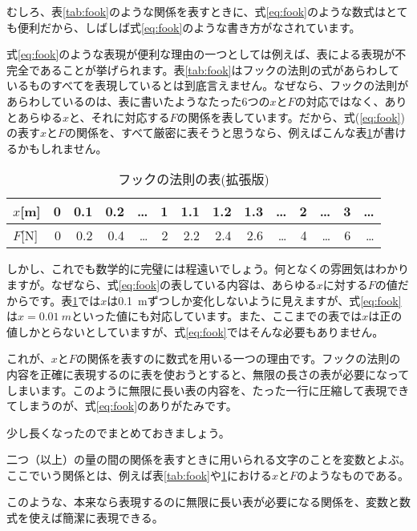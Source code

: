 \documentclass[uplatex,dvipdfmx]{jsarticle}
\begin{document}
	むしろ、表\ref{tab:fook}のような関係を表すときに、式\ref{eq:fook}のような数式はとても便利だから、しばしば式\ref{eq:fook}のような書き方がなされています。

	式\ref{eq:fook}のような表現が便利な理由の一つとしては例えば、表による表現が不完全であることが挙げられます。表\ref{tab:fook}はフックの法則の式があらわしているものすべてを表現しているとは到底言えません。なぜなら、フックの法則があらわしているのは、表に書いたようなたった6つの$x$と$F$の対応ではなく、ありとあらゆる$x$と、それに対応する$F$の関係を表しています。だから、式(\ref{eq:fook})の表す$x$と$F$の関係を、すべて厳密に表そうと思うなら、例えばこんな表\ref{tab:fook_ex}が書けるかもしれません。

	\begin{table}[htbp]
		\caption{フックの法則の表(拡張版)}
		\label{tab:fook_ex}
		\centering
		\begin{tabular}{l||rrrrrrrrrrrrr}
			\hline
			$x$[m] & 0 & 0.1 & 0.2 & \dots & 1 & 1.1 & 1.2 & 1.3 & \dots & 2 & \dots & 3 & \dots \\ 
			\hline
			$F$[N] & 0 & 0.2 & 0.4 & \dots & 2 & 2.2 & 2.4 & 2.6 & \dots & 4 & \dots & 6 & \dots \\
			\hline
		\end{tabular}
	\end{table}

	しかし、これでも数学的に完璧には程遠いでしょう。何となくの雰囲気はわかりますが。なぜなら、式\ref{eq:fook}の表している内容は、あらゆる$x$に対する$F$の値だからです。表\ref{tab:fook_ex}では$x$は\SI{0.1}{m}ずつしか変化しないように見えますが、式\ref{eq:fook}は$x=\SI{0.01}{m}$といった値にも対応しています。また、ここまでの表では$x$は正の値しかとらないとしていますが、式\ref{eq:fook}ではそんな必要もありません。
	
	これが、$x$と$F$の関係を表すのに数式を用いる一つの理由です。フックの法則の内容を正確に表現するのに表を使おうとすると、無限の長さの表が必要になってしまいます。このように無限に長い表の内容を、たった一行に圧縮して表現できてしまうのが、式\ref{eq:fook}のありがたみです。	

	少し長くなったのでまとめておきましょう。

	\begin{tcolorbox}[title=\gtb{変数}]
		二つ（以上）の量の間の関係を表すときに用いられる文字のことを変数とよぶ。ここでいう関係とは、例えば表\ref{tab:fook}や\ref{tab:fook_ex}における$x$と$F$のようなものである。

		このような、本来なら表現するのに無限に長い表が必要になる関係を、変数と数式を使えば簡潔に表現できる。
	\end{tcolorbox}
\end{document}
